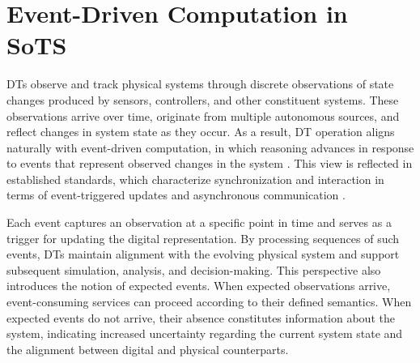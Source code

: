 


\section{Event-Driven Computation in SoTS}
DTs observe and track physical systems through discrete observations of state changes produced by sensors, controllers, and other constituent systems. These observations arrive over time, originate from multiple autonomous sources, and reflect changes in system state as they occur. As a result, DT operation aligns naturally with event-driven computation, in which reasoning advances in response to events that represent observed changes in the system \cite{alghamdi2024synchronization}. This view is reflected in established standards, which characterize synchronization and interaction in terms of event-triggered updates and asynchronous communication \citep{iso23247_1_2021, aas_details_2018_p1}.

Each event captures an observation at a specific point in time and serves as a trigger for updating the digital representation. By processing sequences of such events, DTs maintain alignment with the evolving physical system and support subsequent simulation, analysis, and decision-making. This perspective also introduces the notion of expected events. When expected observations arrive, event-consuming services can proceed according to their defined semantics. When expected events do not arrive, their absence constitutes information about the system, indicating increased uncertainty regarding the current system state and the alignment between digital and physical counterparts.


